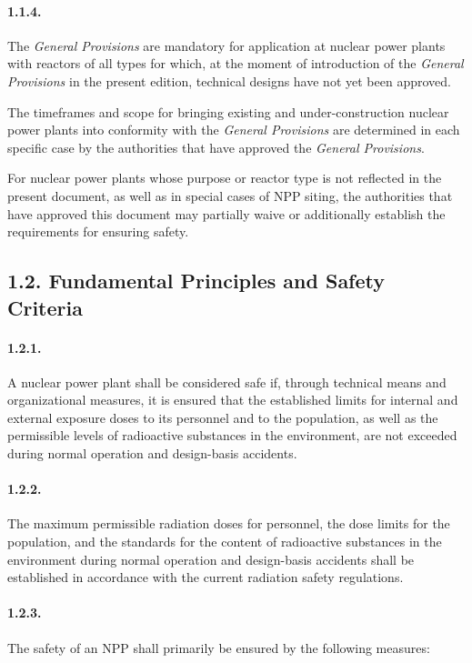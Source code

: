 \documentclass[openright]{bookest}
\begin{document}
\paragraph{1.1.4.}
The \textit{General Provisions} are mandatory for application at nuclear power plants with reactors of all types for which, at the moment of introduction of the \textit{General Provisions} in the present edition, technical designs have not yet been approved.

The timeframes and scope for bringing existing and under-construction nuclear power plants into conformity with the \textit{General Provisions} are determined in each specific case by the authorities that have approved the \textit{General Provisions}.

For nuclear power plants whose purpose or reactor type is not reflected in the present document, as well as in special cases of NPP siting, the authorities that have approved this document may partially waive or additionally establish the requirements for ensuring safety.

\subsection*{1.2. Fundamental Principles and Safety Criteria}

\paragraph{1.2.1.}
A nuclear power plant shall be considered safe if, through technical means and organizational measures, it is ensured that the established limits for internal and external exposure doses to its personnel and to the population, as well as the permissible levels of radioactive substances in the environment, are not exceeded during normal operation and design-basis accidents.

\paragraph{1.2.2.}
The maximum permissible radiation doses for personnel, the dose limits for the population, and the standards for the content of radioactive substances in the environment during normal operation and design-basis accidents shall be established in accordance with the current radiation safety regulations.

\paragraph{1.2.3.}
The safety of an NPP shall primarily be ensured by the following measures:
\end{document}
